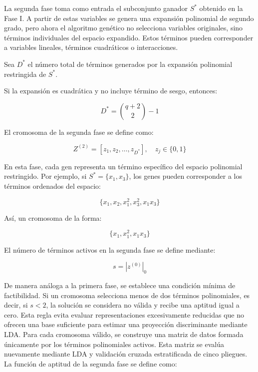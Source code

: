 La segunda fase toma como entrada el subconjunto ganador $S^*$ obtenido en la Fase I. A partir de estas variables se genera una expansión polinomial de segundo grado, pero ahora el  algoritmo genético no selecciona variables originales, sino términos individuales del espacio expandido. Estos términos pueden corresponder a variables lineales, términos cuadráticos o interacciones.

Sea $D^*$ el número total de términos generados por la expansión polinomial restringida de $S^*$.

Si la expansión es cuadrática y no incluye término de sesgo, entonces:


\begin{equation}
	D^* = \binom{q+2}{2}-1
	\label{eq:EM7}
\end{equation}

El cromosoma de la segunda fase se define como:

\begin{equation}
	Z^{(2)} = [z_1,z_2,\dots,z_{D^*}],\quad z_j \in \{0,1\}
	\label{eq:EM8}
\end{equation}

En esta fase, cada gen representa un término específico del espacio polinomial restringido. Por ejemplo, si $S^*= \{x_1,x_3\}$, los genes pueden corresponder a los términos ordenados del espacio:

\begin{equation}
	\{x_1,x_2,x_1^2,x_3^2,x_1x_3\}
	\label{eq:EM9}
\end{equation}

Así, un cromosoma de la forma:

\begin{equation}
	\{x_1,x_1^2,x_1x_3\}
	\label{eq:EM10}
\end{equation}

El número de términos activos en la segunda fase se define mediante:

\begin{equation}
	s = |z^{(0)}|_0
	\label{eq:EM11}
\end{equation}

De manera análoga a la primera fase, se establece una condición mínima de factibilidad. Si un cromosoma selecciona menos de dos términos polinomiales, es decir, si $s<2$, la solución se considera no válida y recibe una aptitud igual a cero. Esta regla evita evaluar representaciones excesivamente reducidas que no ofrecen una base suficiente para estimar una proyección discriminante mediante LDA.
Para cada cromosoma válido, se construye una matriz de datos formada únicamente por los términos polinomiales activos. Esta matriz se evalúa nuevamente mediante LDA y validación cruzada estratificada de cinco pliegues. La función de aptitud de la segunda fase se define como:

